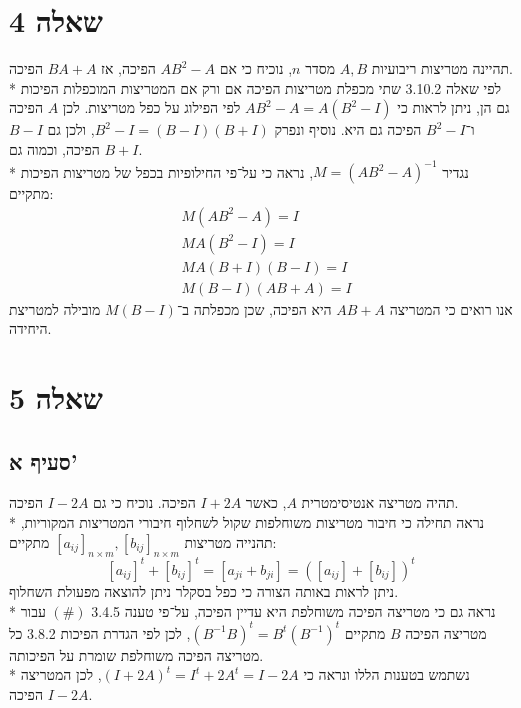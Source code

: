 \documentclass[a4paper, 10pt]{article}
\begin{document}
\begin{hebrew}
	\section{שאלה 4}
	תהיינה מטריצות ריבועיות $A, B$ מסדר $n$,
	נוכיח כי אם $AB^2 - A$ הפיכה, אז $BA + A$ הפיכה. \\*
	לפי שאלה 3.10.2 שתי מכפלת מטריצות הפיכה אם ורק אם
	המטריצות המוכפלות הפיכות גם הן,
	ניתן לראות כי $AB^2 - A = A(B^2 - I)$ לפי הפילוג על כפל מטריצות.
	לכן $A$ הפיכה ו־$B^2 - I$ הפיכה גם היא.
	נוסיף ונפרק $B^2 - I = (B-I)(B+I)$,
	ולכן גם $B - I$ הפיכה, וכמוה גם $B + I$. \\*
	נגדיר $M = {(AB^2 - A)}^{-1}$,
	נראה כי על־פי החילופיות בכפל של מטריצות הפיכות מתקיים:
	\[
		\begin{aligned}
			& M(AB^2 - A) = I \\
			& MA(B^2 - I) = I \\
			& MA(B+I)(B-I) = I \\
			& M(B - I)(AB + A) = I
		\end{aligned}
	\]
	אנו רואים כי המטריצה $AB + A$ היא הפיכה,
	שכן מכפלתה ב־$M(B - I)$ מובילה למטריצת היחידה.

	\section{שאלה 5}
	\subsection{סעיף א'}
	תהיה מטריצה אנטיסימטרית $A$, כאשר $I + 2A$ הפיכה.
	נוכיח כי גם $I - 2A$ הפיכה. \\*
	נראה תחילה כי חיבור מטריצות משוחלפות שקול לשחלוף חיבורי המטריצות המקוריות,
	תהנייה מטריצות ${[a_{ij}]}_{n \times m}, {[b_{ij}]}_{n \times m}$ מתקיים:
	\[
		{[a_{ij}]}^t + {[b_{ij}]}^t =
		[a_{ji} + b_{ji}] =
		{([a_{ij}] + [b_{ij}])}^t
	\]
	ניתן לראות באותה הצורה כי כפל בסקלר ניתן להוצאה מפעולת השחלוף. \\*
	נראה גם כי מטריצה הפיכה משוחלפת היא עדיין הפיכה,
	על־פי טענה 3.4.5 $(\#)$ עבור מטריצה הפיכה $B$ מתקיים
	${(B^{-1}B)}^t = B^t {(B^{-1})}^t$,
	לכן לפי הגדרת הפיכות 3.8.2 כל מטריצה הפיכה משוחלפת שומרת על הפיכותה. \\*
	נשתמש בטענות הללו ונראה כי
	${(I + 2A)}^t = I^t + 2A^t = I - 2A$,
	לכן המטריצה $I - 2A$ הפיכה.


\end{hebrew}
\end{document}
